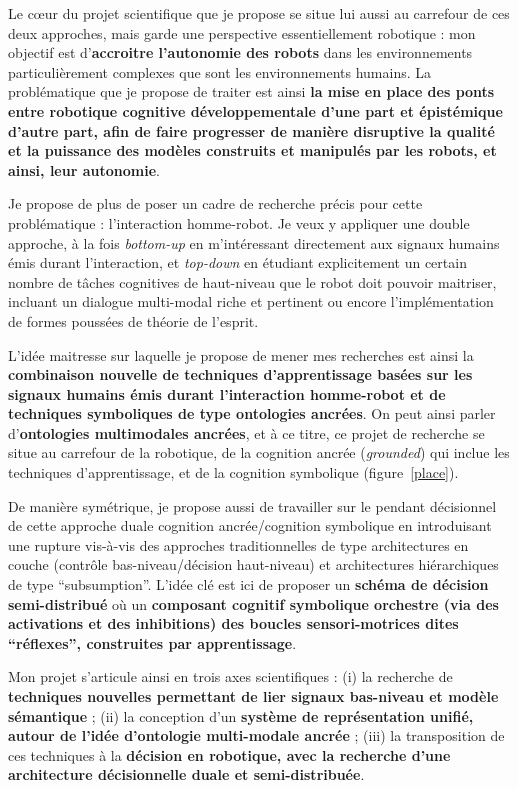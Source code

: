 \documentclass[a4paper]{article}
\begin{document}
Le c\oe ur du projet scientifique que je propose se situe lui aussi au carrefour
de ces deux approches, mais garde une perspective essentiellement robotique :
mon objectif est d'\textbf{accroitre l'autonomie des robots} dans les
environnements particulièrement complexes que sont les environnements humains.
La problématique que je propose de traiter est ainsi \textbf{la mise en
place des ponts entre robotique cognitive développementale d'une part et
épistémique d'autre part, afin de faire progresser de manière disruptive la
qualité et la puissance des modèles construits et manipulés par les robots, et
ainsi, leur autonomie}.

Je propose de plus de poser un cadre de recherche précis pour cette
problématique : l'interaction homme-robot. Je veux y appliquer une double
approche, à la fois \emph{bottom-up} en m'intéressant directement aux
signaux humains émis durant l'interaction, et \emph{top-down} en étudiant
explicitement un certain nombre de tâches cognitives de haut-niveau que le robot
doit pouvoir maitriser, incluant un dialogue multi-modal riche et pertinent ou
encore l'implémentation de formes poussées de théorie de l'esprit.

L'idée maitresse sur laquelle je propose de mener mes recherches est ainsi la
\textbf{combinaison nouvelle de techniques d'apprentissage basées sur les
signaux humains émis durant l'interaction homme-robot et de techniques
symboliques de type ontologies ancrées}. On peut ainsi parler
d'\textbf{ontologies multimodales ancrées}, et à ce titre, ce projet de
recherche se situe au carrefour de la robotique, de la cognition ancrée
(\emph{grounded}) qui inclue les techniques d'apprentissage, et de la cognition
symbolique (figure~\ref{place}).

De manière symétrique, je propose aussi de travailler sur le pendant décisionnel
de cette approche duale cognition ancrée/cognition symbolique en introduisant
une rupture vis-à-vis des approches traditionnelles de type architectures en
couche (contrôle bas-niveau/décision haut-niveau) et architectures
hiérarchiques de type ``subsumption''. L'idée clé est ici de proposer un
\textbf{schéma de décision semi-distribué} où un \textbf{composant cognitif
symbolique orchestre (via des activations et des inhibitions) des boucles
sensori-motrices dites ``réflexes'', construites par apprentissage}.

Mon projet s'articule ainsi en trois axes scientifiques : (i) la recherche de
\textbf{techniques nouvelles permettant de lier signaux bas-niveau et modèle
sémantique} ; (ii) la conception d'un \textbf{système de représentation unifié,
autour de l'idée d'ontologie multi-modale ancrée} ; (iii) la transposition de ces
techniques à la \textbf{décision en robotique, avec la recherche d'une
architecture décisionnelle duale et semi-distribuée}.
\end{document}
